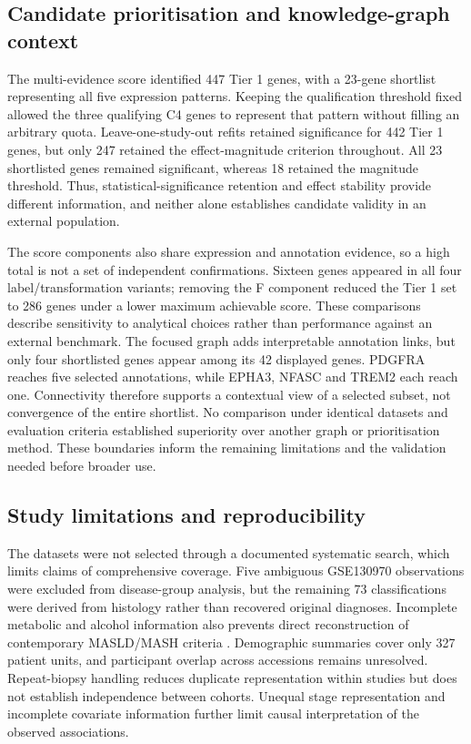 \documentclass[11pt,a4paper]{article}
\begin{document}
\subsection*{Candidate prioritisation and knowledge-graph context}
The multi-evidence score identified 447 Tier 1 genes, with a 23-gene shortlist representing all five expression patterns. Keeping the qualification threshold fixed allowed the three qualifying C4 genes to represent that pattern without filling an arbitrary quota. Leave-one-study-out refits retained significance for 442 Tier 1 genes, but only 247 retained the effect-magnitude criterion throughout. All 23 shortlisted genes remained significant, whereas 18 retained the magnitude threshold. Thus, statistical-significance retention and effect stability provide different information, and neither alone establishes candidate validity in an external population.

The score components also share expression and annotation evidence, so a high total is not a set of independent confirmations. Sixteen genes appeared in all four label/transformation variants; removing the F component reduced the Tier 1 set to 286 genes under a lower maximum achievable score. These comparisons describe sensitivity to analytical choices rather than performance against an external benchmark. The focused graph adds interpretable annotation links, but only four shortlisted genes appear among its 42 displayed genes. PDGFRA reaches five selected annotations, while EPHA3, NFASC and TREM2 each reach one. Connectivity therefore supports a contextual view of a selected subset, not convergence of the entire shortlist. No comparison under identical datasets and evaluation criteria established superiority over another graph or prioritisation method. These boundaries inform the remaining limitations and the validation needed before broader use.

\subsection*{Study limitations and reproducibility}
The datasets were not selected through a documented systematic search, which limits claims of comprehensive coverage. Five ambiguous GSE130970 observations were excluded from disease-group analysis, but the remaining 73 classifications were derived from histology rather than recovered original diagnoses. Incomplete metabolic and alcohol information also prevents direct reconstruction of contemporary MASLD/MASH criteria \cite{ref3}. Demographic summaries cover only 327 patient units, and participant overlap across accessions remains unresolved. Repeat-biopsy handling reduces duplicate representation within studies but does not establish independence between cohorts. Unequal stage representation and incomplete covariate information further limit causal interpretation of the observed associations.
\end{document}
